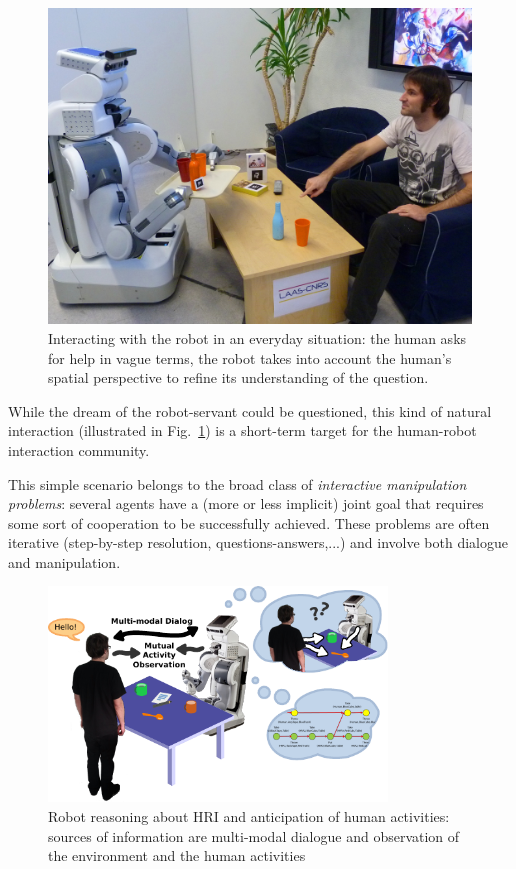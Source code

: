 \documentclass{svmult}
\begin{document}
\begin{figure}%
	\centering
	\includegraphics[width=0.8\linewidth]{figs/aperitif_time.jpg} 
	\caption{Interacting with the robot in an everyday situation: the human 
	asks for help in vague terms, the robot takes into account the human's 
	spatial perspective to refine its understanding of the question.} 
	\label{fig|vpt} 
\end{figure}

While the dream of the robot-servant could be questioned, this kind of natural
interaction (illustrated in Fig.~\ref{fig|vpt}) is a short-term target for the
human-robot interaction community.

This simple scenario belongs to the broad class of \emph{interactive
manipulation problems}: several agents have a (more or less implicit) joint goal that requires some
sort of cooperation to be successfully achieved. These problems are often iterative
(step-by-step resolution, questions-answers,...) and involve both dialogue and
manipulation.


\begin{figure}[htb]
\centering
\includegraphics[width=9cm]{figs/grounding_robot.pdf}
\caption{Robot reasoning about HRI and anticipation of human activities:
  sources of information are multi-modal dialogue and observation of
  the environment and the human activities}
\label{fig|hri-dec}
\end{figure}
\end{document}
